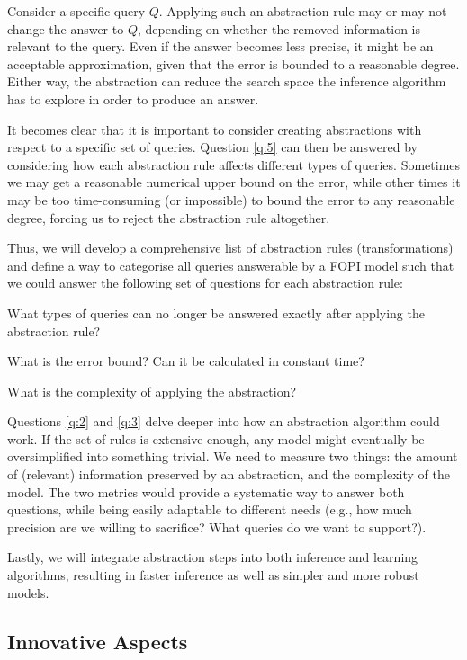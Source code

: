 \documentclass[11pt,english,twocolumn]{article}
\begin{document}
Consider a specific query $Q$. Applying such an abstraction rule may or may not
change the answer to $Q$, depending on whether the removed information
is relevant to the query. Even if the answer becomes less precise, it might be
an acceptable approximation, given that the error is bounded to a reasonable
degree. Either way, the abstraction can reduce the search space the inference
algorithm has to explore in order to produce an answer.

It becomes clear that it is important to consider creating abstractions with
respect to a specific set of queries. Question \ref{q:5} can then be answered by
considering how each abstraction rule affects different types of queries.
Sometimes we may get a reasonable numerical upper bound on the error, while
other times it may be too time-consuming (or impossible) to bound the error to
any reasonable degree, forcing us to reject the abstraction rule altogether.

Thus, we will develop a comprehensive list of abstraction rules
(transformations) and define a way to categorise all queries answerable by a
FOPI model such that we could answer the following set of questions for each
abstraction rule:
\begin{itemize*}
\item What types of queries can no longer be answered exactly after applying the
  abstraction rule?
\item What is the error bound? Can it be calculated in constant time?
\item What is the complexity of applying the abstraction?
\end{itemize*}

Questions \ref{q:2} and \ref{q:3} delve deeper into how an abstraction algorithm
could work. If the set of rules is extensive enough, any model might
eventually be oversimplified into something trivial. We need to measure two
things: the amount of (relevant) information preserved by an abstraction, and
the complexity of the model. The two metrics would provide a systematic way to
answer both questions, while being easily adaptable to different needs (e.g.,
how much precision are we willing to sacrifice? What queries do we want to
support?).

Lastly, we will integrate abstraction steps into both inference and learning
algorithms, resulting in faster inference as well as simpler and more robust
models.

\subsection*{Innovative Aspects} %
\end{document}
